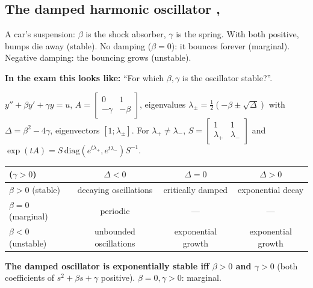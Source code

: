 \subsection{The damped harmonic oscillator \texorpdfstring{, }{}}\label{ss:4-4}
\begin{plainbox}
A car's suspension: $\beta$ is the shock absorber, $\gamma$ is the spring. With both positive, bumps die away (stable).
No damping ($\beta=0$): it bounces forever (marginal). Negative damping: the bouncing grows (unstable).
\par\smallskip\textbf{In the exam this looks like:} ``For which $\beta,\gamma$ is the oscillator stable?''.
\end{plainbox}
$y''+\beta y'+\gamma y=u$, $A=\begin{bmatrix}0&1\\-\gamma&-\beta\end{bmatrix}$, eigenvalues $\lambda_\pm=\frac12(-\beta\pm\sqrt\Delta)$ with $\Delta=\beta^2-4\gamma$, eigenvectors $[1;\lambda_\pm]$.
For $\lambda_+\neq\lambda_-$, $S=\begin{bmatrix}1&1\\\lambda_+&\lambda_-\end{bmatrix}$ and $\exp(tA)=S\,\mathrm{diag}(e^{t\lambda_+},e^{t\lambda_-})S^{-1}$.
\begin{center}
\renewcommand{\arraystretch}{1.3}
\begin{tabular}{@{}lccc@{}}
\toprule
($\gamma>0$) & $\Delta<0$ & $\Delta=0$ & $\Delta>0$\\\midrule
$\beta>0$ (stable) & decaying oscillations & critically damped & exponential decay\\
$\beta=0$ (marginal) & periodic & --- & ---\\
$\beta<0$ (unstable) & unbounded oscillations & exponential growth & exponential growth\\
\bottomrule
\end{tabular}
\end{center}
\textbf{The damped oscillator is exponentially stable iff $\beta>0$ and $\gamma>0$} (both coefficients of $s^2+\beta s+\gamma$ positive). $\beta=0,\gamma>0$: marginal.

